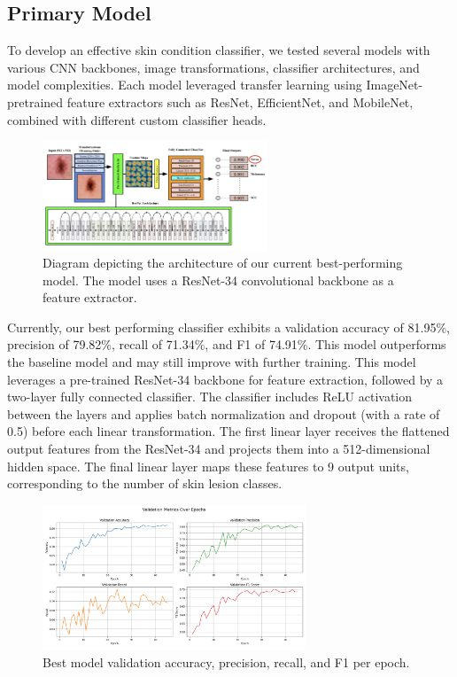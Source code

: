 \documentclass{article} %
\begin{document}
\subsection{Primary Model}

To develop an effective skin condition classifier, we tested several models with various CNN backbones, image transformations, classifier architectures, and model complexities. Each model leveraged transfer learning using ImageNet-pretrained feature extractors such as ResNet, EfficientNet, and MobileNet, combined with different custom classifier heads.

\begin{figure}[h]
\begin{center}
\includegraphics[width=0.6\textwidth]{Figs/model_architecture.png}
\end{center}
\caption{Diagram depicting the architecture of our current best-performing model. The model uses a ResNet-34 convolutional backbone as a feature extractor.}
\end{figure}

Currently, our best performing classifier exhibits a validation accuracy of 81.95\%, precision of 79.82\%, recall of 71.34\%, and F1 of 74.91\%. This model outperforms the baseline model and may still improve with further training. This model leverages a pre-trained ResNet-34 backbone for feature extraction, followed by a two-layer fully connected classifier. The classifier includes ReLU activation between the layers and applies batch normalization and dropout (with a rate of 0.5) before each linear transformation. The first linear layer receives the flattened output features from the ResNet-34 and projects them into a 512-dimensional hidden space. The final linear layer maps these features to 9 output units, corresponding to the number of skin lesion classes.

\begin{figure}[H]
\begin{center}
\includegraphics[width=0.7\textwidth]{Figs/validation_metrics.png}
\end{center}
\caption{Best model validation accuracy, precision, recall, and F1 per epoch.}
\end{figure}
\end{document}
